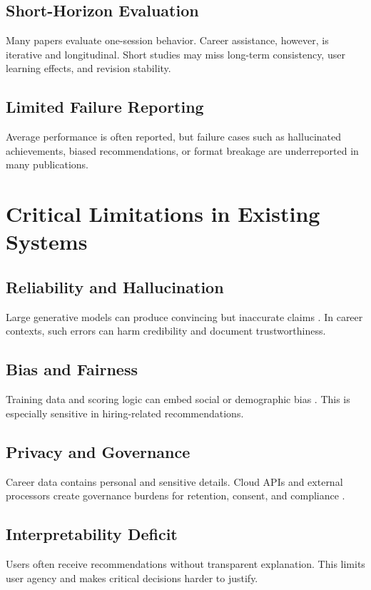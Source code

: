 \documentclass[conference]{IEEEtran}
\begin{document}
\subsection{Short-Horizon Evaluation}
Many papers evaluate one-session behavior. Career assistance, however, is iterative and longitudinal. Short studies may miss long-term consistency, user learning effects, and revision stability.

\subsection{Limited Failure Reporting}
Average performance is often reported, but failure cases such as hallucinated achievements, biased recommendations, or format breakage are underreported in many publications.

\section{Critical Limitations in Existing Systems}
\subsection{Reliability and Hallucination}
Large generative models can produce convincing but inaccurate claims \cite{bender2021}. In career contexts, such errors can harm credibility and document trustworthiness.

\subsection{Bias and Fairness}
Training data and scoring logic can embed social or demographic bias \cite{barocas2016}. This is especially sensitive in hiring-related recommendations.

\subsection{Privacy and Governance}
Career data contains personal and sensitive details. Cloud APIs and external processors create governance burdens for retention, consent, and compliance \cite{gdpr2016}.

\subsection{Interpretability Deficit}
Users often receive recommendations without transparent explanation. This limits user agency and makes critical decisions harder to justify.
\end{document}
